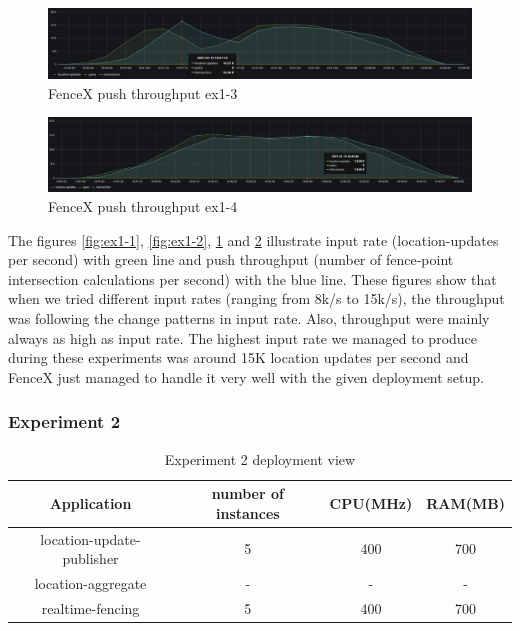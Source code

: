 \documentclass[a4]{report}
\begin{document}
    \begin{figure}[h!]
        \centering
        \caption{FenceX push throughput ex1-3}
        \label{fig:ex1-3}
        \includegraphics[width=\linewidth, scale=2]{images/evaluation/ex1-benchmarking(22,9).png}
    \end{figure}

    \begin{figure}[h!]
        \centering
        \caption{FenceX push throughput ex1-4}
        \label{fig:ex1-4}
        \includegraphics[width=\linewidth, scale=2]{images/evaluation/ex1-benchmarking(23,10).png}
    \end{figure}

    The figures \ref{fig:ex1-1}, \ref{fig:ex1-2}, \ref{fig:ex1-3} and \ref{fig:ex1-4} illustrate input rate
    (location-updates per second) with green line and push throughput (number of fence-point intersection
    calculations per second) with the blue line.
    These figures show that when we tried different input rates (ranging from 8k/s to 15k/s), the throughput was
    following the change patterns in input rate.
    Also, throughput were mainly always as high as input rate.
    The highest input rate we managed to produce during these experiments was around 15K location updates per second
    and FenceX just managed to handle it very well with the given deployment setup.

    \clearpage

    \subsubsection{Experiment 2}
    \begin{table}[h!]
        \centering
        \begin{tabular}{|c|c|c|c|}
            \hline
            Application               & number of instances & CPU(MHz) & RAM(MB) \\
            \hline
            location-update-publisher & 5                   & 400      & 700     \\
            location-aggregate        & -                   & -        & -       \\
            realtime-fencing          & 5                   & 400      & 700     \\
            \hline
        \end{tabular}
        \caption{Experiment 2 deployment view}
        \label{table:ex2-dv}
    \end{table}
\end{document}
